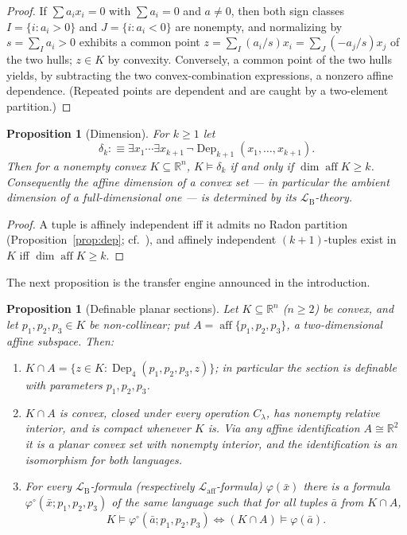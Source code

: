\documentclass[11pt]{amsart}
\newtheorem{proposition}[theorem]{Proposition}
\theoremstyle{definition}
\newcommand{\R}{\mathbb{R}}
\newcommand{\Laff}{\mathcal{L}_{\mathrm{aff}}}
\newcommand{\LB}{\mathcal{L}_{\mathrm{B}}}
\newcommand{\Dep}{\operatorname{Dep}}
\newcommand{\aff}{\operatorname{aff}}
\begin{document}
\begin{proof}
If $\sum a_ix_i=0$ with $\sum a_i=0$ and $a\ne0$, then both sign classes
$I=\{i:a_i>0\}$ and $J=\{i:a_i<0\}$ are nonempty, and normalizing by
$s=\sum_{I}a_i>0$ exhibits a common point
$z=\sum_I(a_i/s)x_i=\sum_J(-a_j/s)x_j$ of the two hulls; $z\in K$ by
convexity. Conversely, a common point of the two hulls yields, by
subtracting the two convex-combination expressions, a nonzero affine
dependence. (Repeated points are dependent and are caught by a two-element
partition.)
\end{proof}

\begin{proposition}[Dimension]\label{prop:dimension}
For $k\ge 1$ let
\[
\delta_k:\equiv\exists x_1\cdots\exists x_{k+1}\,
\neg\Dep_{k+1}(x_1,\dots,x_{k+1}).
\]
Then for a nonempty convex
$K\subseteq\R^n$, $K\models\delta_k$ if and only if $\dim\aff K\ge k$.
Consequently the affine dimension of a convex set --- in particular the
ambient dimension of a full-dimensional one --- is determined by its
$\LB$-theory.
\end{proposition}

\begin{proof}
A tuple is affinely independent iff it admits no Radon partition
(Proposition~\ref{prop:dep}; cf.\ \cite{Matousek02}), and affinely
independent $(k+1)$-tuples exist in $K$ iff $\dim\aff K\ge k$.
\end{proof}

The next proposition is the transfer engine announced in the introduction.

\begin{proposition}[Definable planar sections]
\label{prop:sections}
Let $K\subseteq\R^n$ ($n\ge2$) be convex, and let $p_1,p_2,p_3\in K$ be
non-collinear; put $A=\aff\{p_1,p_2,p_3\}$, a two-dimensional affine
subspace. Then:
\begin{enumerate}[label=\textup{(\roman*)}]
\item $K\cap A=\{z\in K:\Dep_4(p_1,p_2,p_3,z)\}$; in particular the section
is definable with parameters $p_1,p_2,p_3$.
\item $K\cap A$ is convex, closed under every operation $C_\lambda$, has
nonempty relative interior, and is compact whenever $K$ is. Via any affine
identification $A\cong\R^2$ it is a planar convex set with nonempty
interior, and the identification is an isomorphism for both languages.
\item For every $\LB$-formula (respectively $\Laff$-formula)
$\varphi(\bar x)$ there is a formula $\varphi^{\circ}(\bar x;p_1,p_2,p_3)$ of
the same language such that for all tuples $\bar a$ from $K\cap A$,
\[
K\models\varphi^{\circ}(\bar a;p_1,p_2,p_3)
\iff
(K\cap A)\models\varphi(\bar a).
\]
\end{enumerate}
\end{proposition}
\end{document}
